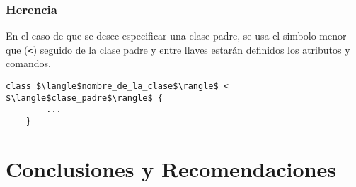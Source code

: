 \documentclass[12pt,letterpaper,titlepage,oneside,openright]{book}
\begin{document}

\subsection{Herencia}

En el caso de que se desee especificar una clase padre, se usa el simbolo menor-que (\texttt{<}) seguido de la clase padre y entre llaves estarán definidos los atributos y comandos.

\begin{center}
\begin{minipage}{\linewidth}
\begin{lstlisting}[mathescape]
    class $\langle$nombre_de_la_clase$\rangle$ < $\langle$clase_padre$\rangle$ {
        ...
    }
\end{lstlisting}
\end{minipage}
\end{center}

\chapter{Conclusiones y Recomendaciones}
\end{document}
